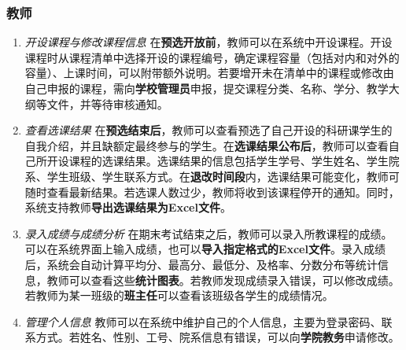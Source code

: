 \subsubsection{教师}
\begin{enumerate}
    \item \textit{开设课程与修改课程信息} \quad 在\textbf{预选开放前}，教师可以在系统中开设课程。开设课程时从课程清单中选择开设的课程编号，确定课程容量（包括对内和对外的容量）、上课时间，可以附带额外说明。若要增开未在清单中的课程或修改由自己申报的课程，需向\textbf{学校管理员}申报，提交课程分类、名称、学分、教学大纲等文件，并等待审核通知。
    \item \textit{查看选课结果} \quad 在\textbf{预选结束后}，教师可以查看预选了自己开设的科研课学生的自我介绍，并且缺额定最终参与的学生。在\textbf{选课结果公布后}，教师可以查看自己所开设课程的选课结果。选课结果的信息包括学生学号、学生姓名、学生院系、学生班级、学生联系方式。在\textbf{退改时间段}内，选课结果可能变化，教师可随时查看最新结果。若选课人数过少，教师将收到该课程停开的通知。同时，系统支持教师\textbf{导出选课结果为Excel文件}。
    \item \textit{录入成绩与成绩分析} \quad 在期末考试结束之后，教师可以录入所教课程的成绩。可以在系统界面上输入成绩，也可以\textbf{导入指定格式的Excel文件}。录入成绩后，系统会自动计算平均分、最高分、最低分、及格率、分数分布等统计信息，教师可以查看这些\textbf{统计图表}。若教师发现成绩录入错误，可以修改成绩。若教师为某一班级的\textbf{班主任}可以查看该班级各学生的成绩情况。
    \item \textit{管理个人信息} \quad 教师可以在系统中维护自己的个人信息，主要为登录密码、联系方式。若姓名、性别、工号、院系信息有错误，可以向\textbf{学院教务}申请修改。
\end{enumerate}

